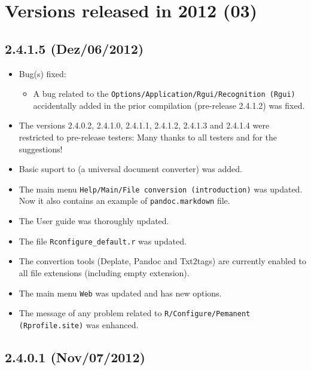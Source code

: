 
\section{Versions released in 2012 (03)}
\subsection{2.4.1.5 (Dez/06/2012)}

\begin{itemize}
  \item Bug(s) fixed:
    \begin{itemize}
      \item A bug related to the \texttt{Options/Application/Rgui/Recognition (Rgui)} accidentally added
        in the prior compilation (pre-release 2.4.1.2) was fixed.
    \end{itemize}
  \item The versions 2.4.0.2, 2.4.1.0, 2.4.1.1, 2.4.1.2, 2.4.1.3 and 2.4.1.4 were restricted to pre-release testers:
    Many thanks to all testers and for the suggestions!
  \item Basic suport to  (a universal document converter) was added.
  \item The main menu \texttt{Help/Main/File conversion (introduction)} was updated. Now it also contains an example of \texttt{pandoc.markdown} file.
  \item The User guide was thoroughly updated.
  \item The file \texttt{Rconfigure\_default.r} was updated.
  \item The convertion tools (Deplate, Pandoc and Txt2tags) are currently enabled to all file extensions (including empty extension).
  \item The main menu \texttt{Web} was updated and has new options.
  \item The message of any problem related to \texttt{R/Configure/Pemanent (Rprofile.site)} was enhanced.
\end{itemize}

\subsection{2.4.0.1 (Nov/07/2012)}

